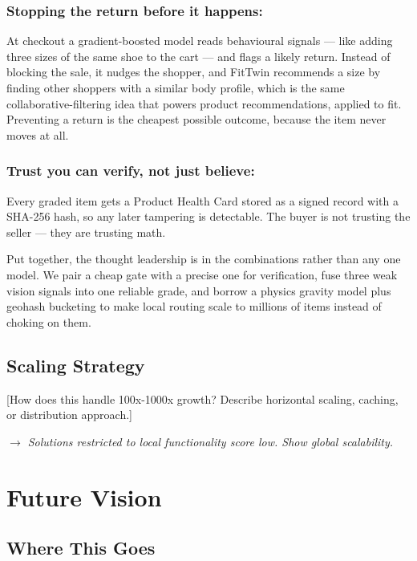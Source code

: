 \documentclass[11pt]{article}
\newcommand{\placeholder}[1]{{\color{placeGray} #1}}
\newcommand{\tip}[1]{{\itshape\color{tipGray} $\rightarrow$ #1}}
\begin{document}
\subsubsection*{\color{amznSlate} Stopping the return before it happens:}
\placeholder{At checkout a gradient-boosted model reads behavioural signals --- like adding three sizes of the same shoe to the cart --- and flags a likely return. Instead of blocking the sale, it nudges the shopper, and FitTwin recommends a size by finding other shoppers with a similar body profile, which is the same collaborative-filtering idea that powers product recommendations, applied to fit. Preventing a return is the cheapest possible outcome, because the item never moves at all.}

\subsubsection*{\color{amznSlate} Trust you can verify, not just believe:}
\placeholder{Every graded item gets a Product Health Card stored as a signed record with a SHA-256 hash, so any later tampering is detectable. The buyer is not trusting the seller --- they are trusting math.}

\vspace{6pt}
\placeholder{Put together, the thought leadership is in the combinations rather than any one model. We pair a cheap gate with a precise one for verification, fuse three weak vision signals into one reliable grade, and borrow a physics gravity model plus geohash bucketing to make local routing scale to millions of items instead of choking on them.}


\subsection{Scaling Strategy}
\placeholder{[How does this handle 100x-1000x growth? Describe horizontal scaling, caching, or distribution approach.]}

\tip{Solutions restricted to local functionality score low. Show global scalability.}

\section{Future Vision}

\subsection{Where This Goes}
\end{document}
